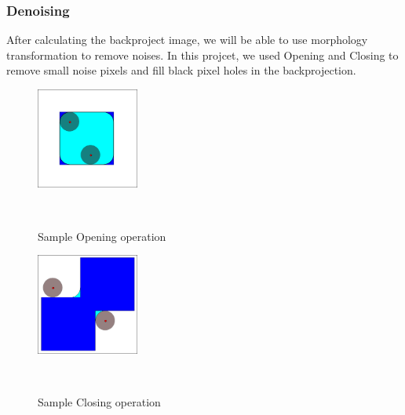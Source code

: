 \subsubsection{Denoising}
After calculating the backproject image, we will be able to use morphology transformation to remove noises. In this projcet, we used Opening and Closing to remove small noise pixels and fill black pixel holes in the backprojection.\\
\begin{figure}[h!]
  
  \centering
    \includegraphics[width=0.3\textwidth]{./Pictures/Opening.png}
    \caption{Sample Opening operation\cite{cite7}}\\
\end{figure}
\begin{figure}[h!]
  
  \centering
    \includegraphics[width=0.3\textwidth]{./Pictures/Closing.png}
    \caption{Sample Closing operation\cite{cite6}}\\
\end{figure}

